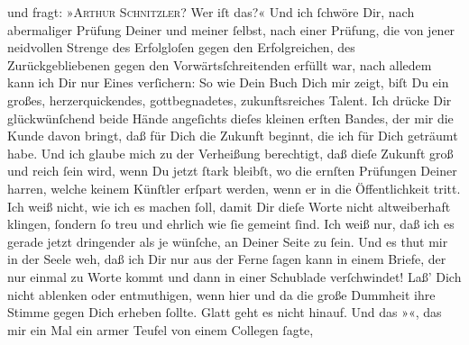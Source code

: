\begin{ledgroupsized}[t]{13cm}
               und fragt: »\textsc{Arthur Schnitzler}? Wer iſt das?« Und ich
               ſchwöre Dir, nach abermaliger Prüfung Deiner und meiner ſelbst, nach einer Prüfung,
                  {\pb}die von jener neidvollen Strenge des Erfolgloſen
               gegen den Erfolgreichen, des Zurückgebliebenen gegen den Vorwärtsſchreitenden erfüllt
               war, nach alledem kann ich Dir nur Eines verſichern: So wie Dein Buch Dich mir zeigt, biſt Du ein großes,
               herzerquickendes, gottbegnadetes, zukunftsreiches Talent. Ich drücke Dir
               glückwünſchend beide Hände angeſichts dieſes kleinen erſten Bandes, der mir die Kunde davon bringt, daß
               für Dich die Zukunft beginnt, die ich für Dich geträumt habe. Und ich glaube mich zu
               der Verheißung berechtigt, daß dieſe Zukunft groß und reich ſein wird, wenn Du jetzt
                  {\pb}ſtark bleibſt, wo die ernſten Prüfungen Deiner
               harren, welche keinem Künſtler erſpart werden, wenn er in die Öffentlichkeit tritt.
               Ich weiß nicht, wie ich es machen ſoll, damit Dir dieſe Worte nicht altweiberhaft
               klingen, ſondern ſo treu und ehrlich wie ſie gemeint ſind. Ich weiß nur, daß ich es
               gerade jetzt dringender als je wünſche, \strikeout{\textcolor{gray}{und}} an Deiner Seite zu ſein. Und es thut mir in der Seele weh, daß ich Dir nur aus
               der Ferne ſagen kann in einem Briefe, der nur einmal zu Worte kommt und dann in einer
               Schublade verſchwindet! {\pb}Laß’ Dich nicht ablenken
               oder entmuthigen, wenn hier und da die große Dummheit ihre Stimme gegen Dich erheben
               ſollte. Glatt geht es nicht hinauf. Und das »\label{K_L02703-1v}\label{K_L02703-1h}«, das mir ein Mal ein armer Teufel von einem Collegen ſagte,

\end{ledgroupsized}
